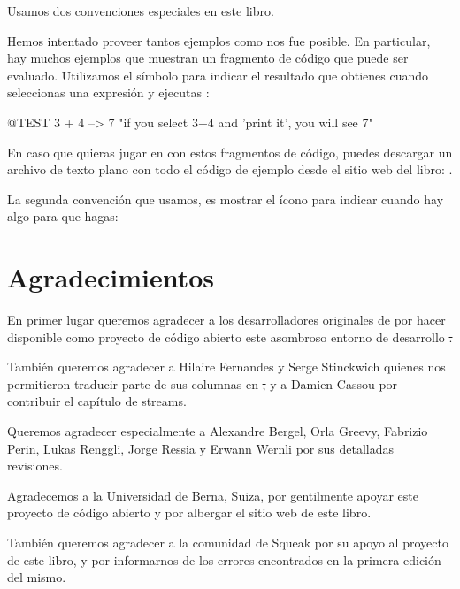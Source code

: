\documentclass[a4paper,spanish, 10pt,twoside]{book}
\begin{document}
Usamos dos convenciones especiales en este libro.

Hemos intentado proveer tantos ejemplos como nos fue posible.
En particular, hay muchos ejemplos que muestran un fragmento de código que puede ser evaluado. Utilizamos el símbolo \ct{-->} para indicar el resultado que obtienes cuando seleccionas una expresión y ejecutas :

\begin{code}{@TEST}
3 + 4 --> 7    "if you select 3+4 and 'print it', you will see 7"
\end{code}

En caso que quieras jugar en \pharo con estos fragmentos de código, puedes descargar un archivo de texto plano con todo el código de ejemplo desde el sitio web del libro: \pbe.

La segunda convención que usamos, es mostrar el ícono \dothisicon{} para indicar cuando hay algo para que hagas:


\section*{Agradecimientos}

En primer lugar queremos agradecer a los desarrolladores originales de \squeak por hacer disponible como proyecto de código abierto este asombroso entorno de desarrollo \st.

También queremos agradecer a Hilaire Fernandes y Serge Stinckwich quienes nos permitieron traducir parte de sus columnas en \st, y a Damien Cassou por contribuir el capítulo de streams.

Queremos agradecer especialmente a Alexandre Bergel, Orla Greevy, Fabrizio Perin, Lukas Renggli, Jorge Ressia y Erwann Wernli por sus detalladas revisiones.

Agradecemos a la Universidad de Berna, Suiza, por gentilmente apoyar este proyecto de código abierto y por albergar el sitio web de este libro.

También queremos agradecer a la comunidad de Squeak por su apoyo al proyecto de este libro, y por informarnos de los errores encontrados en la primera edición del mismo.


\ifx\wholebook\relax\else
   
   
\end{document}
